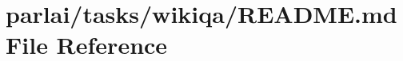 \hypertarget{parlai_2tasks_2wikiqa_2README_8md}{}\section{parlai/tasks/wikiqa/\+R\+E\+A\+D\+ME.md File Reference}
\label{parlai_2tasks_2wikiqa_2README_8md}
